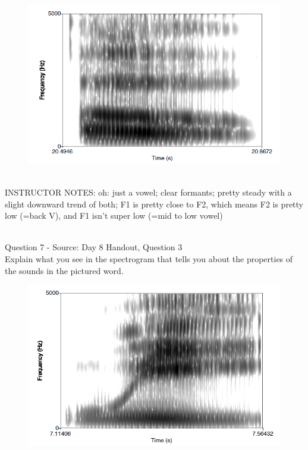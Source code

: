 \documentclass[12pt]{article}
\begin{document}
\begin{figure}[H]
\includegraphics{../images/spectrogram_oh.png}
\end{figure}

~\\
INSTRUCTOR NOTES: oh: just a vowel; clear formants; pretty steady with a slight downward trend of both; F1 is pretty close to F2, which means F2 is pretty low (=back V), and F1 isn't super low (=mid to low vowel)


~\\

{\large Question 7} - Source: Day 8 Handout, Question 3\\

Explain what you see in the spectrogram that tells you about the properties of the sounds in the pictured word.\\

\begin{figure}[H]
\includegraphics{../images/spectrogram_we.png}
\end{figure}
\end{document}
